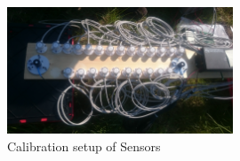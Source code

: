 \documentclass[oneside]{report}
\begin{document}
\begin{figure}[H]
  \centering
  \includegraphics[width=0.6\textwidth]{graphs/Installation.JPG}
	\caption{Calibration setup of Sensors}
\end{figure}
































































\end{document}
